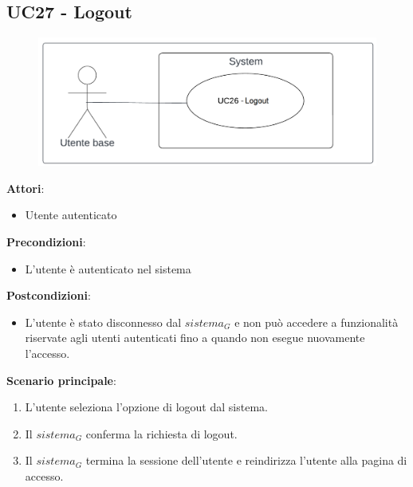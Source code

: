 \subsection{UC27 - Logout}\label{usecase:27}
\begin{figure}[H]
\centering
\includegraphics[width=0.75\linewidth]{ucd/UCD27.png}
\end{figure}
\textbf{Attori}:
\begin{itemize}
    \item Utente autenticato
\end{itemize}
\textbf{Precondizioni}:
\begin{itemize}
    \item L'utente è autenticato nel sistema
\end{itemize}
\textbf{Postcondizioni}:
\begin{itemize}
    \item L'utente è stato disconnesso dal $\textit{sistema}_G$ e non può accedere a funzionalità riservate agli utenti autenticati fino a quando non esegue nuovamente l'accesso.
\end{itemize}
\textbf{Scenario principale}:
\begin{enumerate}
    \item L'utente seleziona l'opzione di logout dal sistema.
    \item Il $\textit{sistema}_G$ conferma la richiesta di logout.
    \item Il $\textit{sistema}_G$ termina la sessione dell'utente e reindirizza l'utente alla pagina di accesso.
\end{enumerate}

\newpage